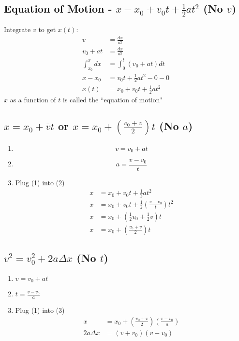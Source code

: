 \documentclass{article}
\begin{document}
\subsection{Equation of Motion - $ x - x_0 + v_0t + \frac{1}{2}at^2 $ (No $ v $)}
Integrate $ v $ to get $ x(t) $:
\begin{align}
	v & = \frac{dx}{dt} \\
	v_0 + at & = \frac{dx}{dt} \\
	\int_{x_0}^x dx & = \int_0^t \left( v_0 + at \right) dt \\
	x - x_0 & = v_0t + \frac{1}{2}at^2 - 0 - 0 \\
x(t) & = x_0 + v_0t + \frac{1}{2}at^2
\end{align}
$ x $ as a function of $ t $ is called the ``equation of motion"

\subsection{$ x = x_0 + \bar{v}t $ or $x = x_0 + \left( \frac{v_0 + v}{2} \right) t $ (No $ a $)}
\begin{enumerate}[label=\textbf{(\arabic*)}]
	\item $$ v = v_0 + at $$
	\item $$ a = \frac{v - v_0}{t} $$
	\item Plug (1) into (2)
		\begin{align}
			x & = x_0 + v_0t + \frac{1}{2}at^2 \\
			x & = x_0 + v_0t + \frac{1}{2} \left( \frac{v - v_0}{t} \right) t^2 \\
			x & = x_0 + \left( \frac{1}{2}v_0 + \frac{1}{2}v \right) t \\
			x & = x_0 + \left( \frac{v_0 + v}{2} \right) t
		\end{align}
\end{enumerate}

\subsection{$ v^2 = v_0^2 + 2a\Delta x $ (No $ t $)}
\begin{enumerate}[label=\textbf{(\arabic*)}]
	\item $ v = v_0 + at $
	\item $ t = \frac{v - v_0}{a} $
	\item Plug (1) into (3)
		\begin{align}
			x & = x_0 + \left( \frac{v_0 + v}{2} \right) \left( \frac{v - v_0}{a} \right) \\
			2a\Delta x & = (v + v_0)(v - v_0)
		\end{align}
\end{enumerate}
\end{document}

